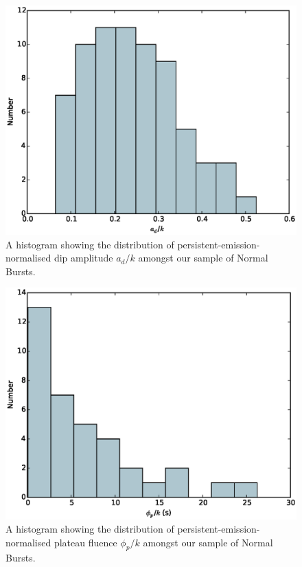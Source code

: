 \begin{figure}
  \centering
  \includegraphics[width=.9\linewidth, trim={0cm 0 0cm 0},clip]{images/appendix_dip_pa_n_hist.eps}
  \caption[Histogram showing the distribution of $a_d/k$ amongst Normal Bursts.]{A histogram showing the distribution of persistent-emission-normalised dip amplitude $a_d/k$ amongst our sample of Normal Bursts.}
  \label{fig:app_hist_ad_n}
\end{figure}

\begin{figure}
  \centering
  \includegraphics[width=.9\linewidth, trim={0cm 0 0cm 0},clip]{images/appendix_plat_aafluence_n_hist.eps}
  \caption[Histogram showing the distribution of $\phi_p/k$ amongst Normal Bursts.]{A histogram showing the distribution of persistent-emission-normalised plateau fluence $\phi_p/k$ amongst our sample of Normal Bursts.}
  \label{fig:app_hist_phip_n}
\end{figure}

